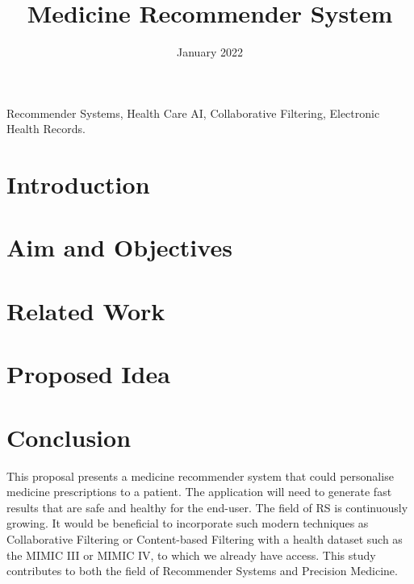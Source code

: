 \documentclass[conference]{IEEEtran}
\begin{document}
\title{Medicine Recommender System}

\author{
	\date{January 2022}
}

\maketitle

\begin{abstract}
    
\end{abstract}

\begin{IEEEkeywords}
    Recommender Systems, Health Care AI, Collaborative Filtering,
    Electronic Health Records.
\end{IEEEkeywords}

\section{Introduction}
    

\section{Aim and Objectives}
    


\section{Related Work}
    

\section{Proposed Idea}
    

\section{Conclusion}
This proposal presents a medicine recommender system that could
personalise medicine prescriptions to a patient. The application will need
to generate fast results that are safe and healthy for the end-user. The
field of RS is continuously growing. It would be beneficial to incorporate
such modern techniques as Collaborative Filtering or Content-based
Filtering with a health dataset such as the MIMIC III or MIMIC IV, to
which we already have access. This study contributes to both the field of
Recommender Systems and Precision Medicine.




\end{document}

